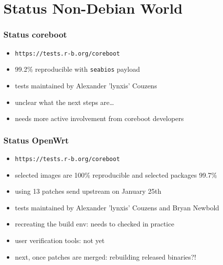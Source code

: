 \documentclass[14pt,aspectratio=169]{beamer}
\newif\ifplacelogo
\begin{document}
\section{Status Non-Debian World}

\placelogofalse

\begin{frame}
 \frametitle{Status coreboot}
 \begin{itemize}
  \item \texttt{https://tests.r-b.org/coreboot}
  \item 99.2\% reproducible with \texttt{seabios} payload
  \item tests maintained by Alexander 'lynxis' Couzens
  \item unclear what the next steps are…
  \item needs more active involvement from coreboot developers
 \end{itemize}
\end{frame}

\begin{frame}
 \frametitle{Status OpenWrt}
 \begin{itemize}
  \item \texttt{https://tests.r-b.org/coreboot}
  \item selected images are 100\% reproducible and selected packages 99.7\%
  \item using 13 patches send upstream on January 25th
  \item tests maintained by Alexander 'lynxis' Couzens and Bryan Newbold
  \item recreating the build env: needs to checked in practice
  \item user verification tools: not yet
  \item next, once patches are merged: rebuilding released binaries?!
 \end{itemize}
\end{frame}
\end{document}
